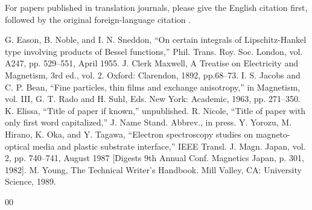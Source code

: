 \documentclass[conference]{IEEEtran}
\begin{document}
For papers published in translation journals, please give the English 
citation first, followed by the original foreign-language citation \cite{b6}.

\begin{thebibliography}{00}
 G. Eason, B. Noble, and I. N. Sneddon, ``On certain integrals of Lipschitz-Hankel type involving products of Bessel functions,'' Phil. Trans. Roy. Soc. London, vol. A247, pp. 529--551, April 1955.
 J. Clerk Maxwell, A Treatise on Electricity and Magnetism, 3rd ed., vol. 2. Oxford: Clarendon, 1892, pp.68--73.
 I. S. Jacobs and C. P. Bean, ``Fine particles, thin films and exchange anisotropy,'' in Magnetism, vol. III, G. T. Rado and H. Suhl, Eds. New York: Academic, 1963, pp. 271--350.
 K. Elissa, ``Title of paper if known,'' unpublished.
 R. Nicole, ``Title of paper with only first word capitalized,'' J. Name Stand. Abbrev., in press.
 Y. Yorozu, M. Hirano, K. Oka, and Y. Tagawa, ``Electron spectroscopy studies on magneto-optical media and plastic substrate interface,'' IEEE Transl. J. Magn. Japan, vol. 2, pp. 740--741, August 1987 [Digests 9th Annual Conf. Magnetics Japan, p. 301, 1982].
 M. Young, The Technical Writer's Handbook. Mill Valley, CA: University Science, 1989.
\end{thebibliography}

{00}

\end{document}
